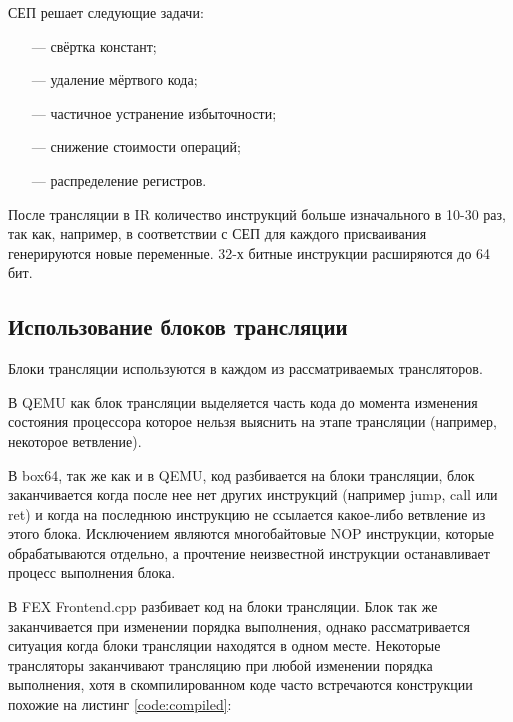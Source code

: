 СЕП решает следующие задачи:
\begin{itemize}[leftmargin=1.6\parindent]
	\item[---] свёртка констант;
	\item[---] удаление мёртвого кода;
	\item[---] частичное устранение избыточности;
	\item[---] снижение стоимости операций;
	\item[---] распределение регистров.
\end{itemize}

После трансляции в IR количество инструкций больше изначального в 10-30 раз, так как, например, в соответствии с СЕП для каждого присваивания генерируются новые переменные. 32-х битные инструкции расширяются до 64 бит.

\subsection{Использование блоков трансляции}

Блоки трансляции используются в каждом из рассматриваемых трансляторов.

В QEMU как блок трансляции выделяется часть кода до момента изменения состояния процессора которое нельзя выяснить на этапе трансляции (например, некоторое ветвление). \cite{qemu_docs}

В box64, так же как и в QEMU, код разбивается на блоки трансляции, блок заканчивается когда после нее нет других инструкций (например jump, call или ret) и когда на последнюю инструкцию не ссылается какое-либо ветвление из этого блока. Исключением являются многобайтовые NOP инструкции, которые обрабатываются отдельно, а прочтение неизвестной инструкции останавливает процесс выполнения блока. \cite{box64_letter}

В FEX Frontend.cpp разбивает код на блоки трансляции. Блок так же заканчивается при изменении порядка выполнения, однако рассматривается ситуация когда блоки трансляции находятся в одном месте. Некоторые трансляторы заканчивают трансляцию при любой изменении порядка выполнения, хотя в скомпилированном коде часто встречаются конструкции похожие на листинг \ref{code:compiled}:


